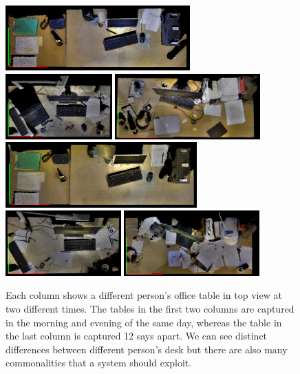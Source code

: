 \documentclass[letterpaper, 10 pt, conference]{ieeeconf}  %
\begin{document}
\begin{figure}
\begin{center}
\includegraphics[height=2.5cm]{David_Mor_131110} \quad
\includegraphics[height=2.5cm]{Nils_Mor_131111} \quad
\includegraphics[height=2.5cm]{Puren_Eve_131029}\\ \smallskip
\includegraphics[height=2.5cm]{David_Eve_131110} \enskip
\includegraphics[height=2.5cm]{Nils_Eve_131111} \enskip
\includegraphics[height=2.5cm]{Puren_Mor_131110}
\caption{Each column shows a different person's office table in top view at two different times. The tables in the first two columns are captured in the morning and evening of the same day, whereas the table in the last column is captured 12 says apart. We can see distinct differences between different person's desk but there are also many commonalities that a system should exploit. }
\label{fig:Example Scenes}
\end{center}
\end{figure}
\end{document}
